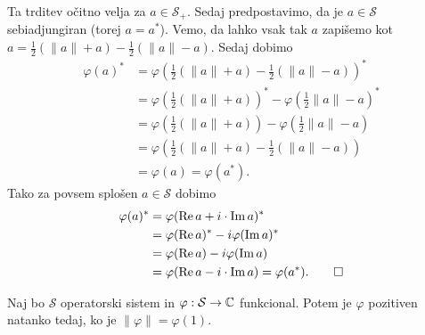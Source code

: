\begin{dokaz}
    Ta trditev očitno velja za $a \in \mathcal{S}_+$.
    Sedaj predpostavimo, da je $a \in \mathcal{S}$ sebiadjungiran (torej $a = a^*$). 
    Vemo, da lahko vsak tak $a$ zapišemo kot $a = \frac{1}{2} (\| a\| + a) - \frac{1}{2}(\| a\| - a)$.
    Sedaj dobimo
    \begin{align*}
        \varphi (a)^* &= \varphi \left(\frac{1}{2} \left(\| a \| + a \right) - \frac{1}{2} \left(\| a \| - a \right)\right)^*\\
        &= \varphi \left(\frac{1}{2} (\| a \| + a)\right)^* - \varphi \left(\frac{1}{2} \| a\| - a\right)^*\\
        &= \varphi \left(\frac{1}{2} (\| a \| + a)\right) - \varphi \left(\frac{1}{2} \| a\| - a \right)\\
        &= \varphi \left(\frac{1}{2} \left(\| a \| + a \right) - \frac{1}{2} \left(\| a \| - a \right)\right)\\
        &= \varphi(a) = \varphi(a^*).
    \end{align*}
    Tako za povsem splošen $a \in \mathcal{S}$ dobimo
    \begin{align*}
        \varphi(a)^* &= \varphi(\operatorname{Re} a + i \cdot \operatorname{Im} a)^*\\
        &= \varphi(\operatorname{Re} a)^* - i \varphi(\operatorname{Im} a)^*\\
        &= \varphi(\operatorname{Re} a) - i \varphi (\operatorname{Im} a)\\
        &= \varphi(\operatorname{Re} a - i \cdot \operatorname{Im} a) = \varphi(a^*). \qedhere
    \end{align*}
\end{dokaz}

\begin{lema}\label{lem:1.1}
    Naj bo $\mathcal{S}$ operatorski sistem in $\varphi: \mathcal{S} \to \mathbb C$ funkcional.
    Potem je $\varphi$ pozitiven natanko tedaj, ko je $\| \varphi\| = \varphi(1)$.
\end{lema}


